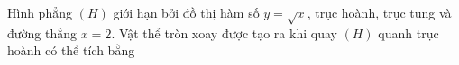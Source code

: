 \begin{ex}
Hình phẳng $(H)$ giới hạn bởi đồ thị hàm số $y=\sqrt x$, trục hoành, trục tung và đường thẳng $x=2$. Vật thể tròn xoay được tạo ra khi quay $(H)$ quanh trục hoành có thể tích bằng
\end{ex}
